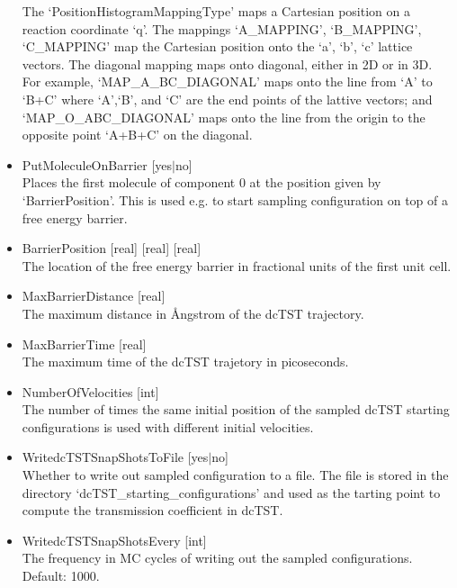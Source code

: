 \begin{itemize}
The `PositionHistogramMappingType' maps a Cartesian position on a reaction coordinate `q'.
The mappings `A\_MAPPING', `B\_MAPPING', `C\_MAPPING' map the Cartesian position onto the `a', `b', `c' lattice vectors.
The diagonal mapping maps onto diagonal, either in 2D or in 3D. For example, `MAP\_A\_BC\_DIAGONAL' maps onto the line from `A' to `B+C' where
`A',`B', and `C' are the end points of the lattive vectors; and `MAP\_O\_ABC\_DIAGONAL' maps onto the line from the origin to the opposite point `A+B+C' on the diagonal.
\item{PutMoleculeOnBarrier [yes$|$no]}\\
Places the first molecule of component 0 at the position given by `BarrierPosition'. This is used e.g. to start sampling configuration on top of a free energy barrier.
\item{BarrierPosition [real] [real] [real]}\\
The location of the free energy barrier in fractional units of the first unit cell.
\item{MaxBarrierDistance [real]}\\
The maximum distance in \AA ngstrom of the dcTST trajectory.
\item{MaxBarrierTime [real]}\\
The maximum time of the dcTST trajetory in picoseconds.
\item{NumberOfVelocities [int]}\\
The number of times the same initial position of the sampled dcTST starting configurations is used with different initial velocities.
\item{WritedcTSTSnapShotsToFile [yes$|$no]}\\
Whether to write out sampled configuration to a file. The file is stored in the directory `dcTST\_starting\_configurations' and used
as the tarting point to compute the transmission coefficient in dcTST.
\item{WritedcTSTSnapShotsEvery [int]}\\
The frequency in MC cycles of writing out the sampled configurations. Default: 1000.
\end{itemize}